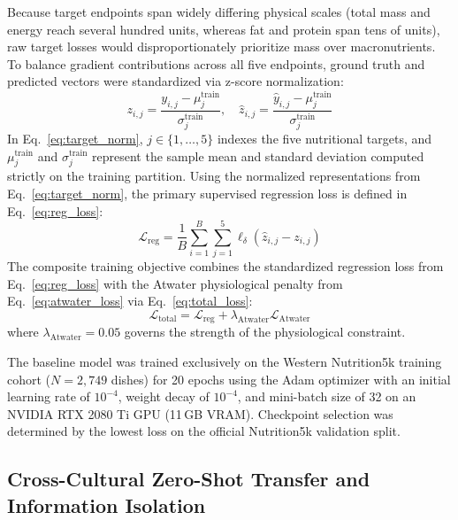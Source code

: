\documentclass[utf8]{FrontiersinVancouver}
\begin{document}
Because target endpoints span widely differing physical scales (total mass and energy reach several hundred units, whereas fat and protein span tens of units), raw target losses would disproportionately prioritize mass over macronutrients. To balance gradient contributions across all five endpoints, ground truth and predicted vectors were standardized via z-score normalization:
\begin{equation}
    \label{eq:target_norm}
    z_{i,j} = \frac{y_{i,j} - \mu_j^{\text{train}}}{\sigma_j^{\text{train}}}, \quad \hat{z}_{i,j} = \frac{\hat{y}_{i,j} - \mu_j^{\text{train}}}{\sigma_j^{\text{train}}}
\end{equation}
In Eq.~\ref{eq:target_norm}, $j \in \{1, \dots, 5\}$ indexes the five nutritional targets, and $\mu_j^{\text{train}}$ and $\sigma_j^{\text{train}}$ represent the sample mean and standard deviation computed strictly on the training partition. Using the normalized representations from Eq.~\ref{eq:target_norm}, the primary supervised regression loss is defined in Eq.~\ref{eq:reg_loss}:
\begin{equation}
    \label{eq:reg_loss}
    \mathcal{L}_{\text{reg}} = \frac{1}{B} \sum_{i=1}^B \sum_{j=1}^5 \ell_\delta \left( \hat{z}_{i,j} - z_{i,j} \right)
\end{equation}
The composite training objective combines the standardized regression loss from Eq.~\ref{eq:reg_loss} with the Atwater physiological penalty from Eq.~\ref{eq:atwater_loss} via Eq.~\ref{eq:total_loss}:
\begin{equation}
    \label{eq:total_loss}
    \mathcal{L}_{\text{total}} = \mathcal{L}_{\text{reg}} + \lambda_{\text{Atwater}} \mathcal{L}_{\text{Atwater}}
\end{equation}
where $\lambda_{\text{Atwater}} = 0.05$ governs the strength of the physiological constraint.

The baseline model was trained exclusively on the Western Nutrition5k training cohort ($N=2,749$ dishes) for 20 epochs using the Adam optimizer with an initial learning rate of $10^{-4}$, weight decay of $10^{-4}$, and mini-batch size of 32 on an NVIDIA RTX 2080 Ti GPU (11\,GB VRAM). Checkpoint selection was determined by the lowest loss on the official Nutrition5k validation split.

\subsection{Cross-Cultural Zero-Shot Transfer and Information Isolation}
\end{document}

